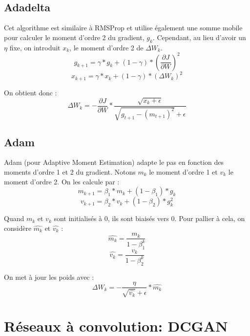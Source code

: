 \subsection{Adadelta}
Cet algorithme est similaire à RMSProp et utilise également une somme mobile pour calculer le moment d'ordre 2 du gradient, $g_k$. Cependant, au lieu d'avoir un $\eta$ fixe, on introduit $x_k$, le moment d'ordre 2 de $\Delta W_k$.
\[g_{k+1} = \gamma*g_k + (1-\gamma)*(\frac{\partial J}{\partial W})^2\]
\[x_{k+1} = \gamma*x_k + (1-\gamma)*(\Delta W_k)^2\]

On obtient donc :
\[\Delta W_k = -\frac{\partial J}{\partial W}*\frac{\sqrt{x_k + \epsilon}}{\sqrt{g_{t+1}-(m_{t+1})^2}+\epsilon}\]
\subsection{Adam}
Adam (pour Adaptive Moment Estimation) adapte le pas en fonction des moments d'ordre 1 et 2 du gradient. Notons $m_k$ le moment d'ordre 1 et $v_k$ le moment d'ordre 2.
On les calcule par :
\[m_{k+1} = \beta_1*m_k + (1-\beta_1)*g_k\]
\[v_{k+1} = \beta_2*v_k + (1-\beta_2)*g_k^2\]

Quand $m_k$ et $v_k$ sont initialisés à 0, ils sont biaisés vers 0.
Pour pallier à cela, on considère $\widehat{m_k}$ et $\widehat{v_k}$ : 
\[\widehat{m_{k}} = \frac{m_k}{1-\beta_1^k}\]
\[\widehat{v_{k}} = \frac{v_k}{1-\beta_2^k}\]

On met à jour les poids avec :
\[\Delta W_k = -\frac{\eta}{\sqrt{\widehat{v_k}}+\epsilon}*\widehat{m_k}\]

\section{Réseaux à convolution: DCGAN}